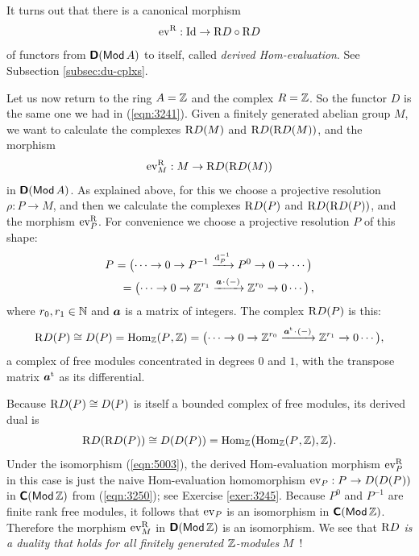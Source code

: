 It turns out that there is a canonical morphism 
\begin{equation} \label{eqn:3247}
\operatorname{ev}^{\mathrm{R}} : \operatorname{Id} \to \mathrm{R} D \circ \mathrm{R} D
\end{equation}
of functors from $\boldsymbol{\mathsf{D}}(\operatorname{\mathsf{Mod}} A)$ to itself, called {\em derived 
Hom-evaluation}. See Subsection 
\ref{subsec:du-cplxs}. 

Let us now return to the ring $A = \mathbb{Z}$ and the complex $R = \mathbb{Z}$. 
So the functor $D$ is the same one we had in (\ref{eqn:3241}).
Given a finitely generated abelian group $M$, we want to calculate the 
complexes $\mathrm{R} D(M)$ and $\mathrm{R} D(\mathrm{R} D(M))$, and the morphism 
\begin{equation} \label{eqn:3248}
\operatorname{ev}^{\mathrm{R}}_M : M \to \mathrm{R} D(\mathrm{R} D(M)) 
\end{equation}
in $\boldsymbol{\mathsf{D}}(\operatorname{\mathsf{Mod}} A)$. As explained above, for this we choose a 
projective resolution $\rho : P \to M$,
and then we calculate  the complexes $\mathrm{R} D(P)$ and 
$\mathrm{R} D(\mathrm{R} D(P))$, and the morphism $\operatorname{ev}^{\mathrm{R}}_P$. 
For convenience we choose a projective resolution $P$ of this shape:
\[ \begin{aligned}
& P^{} = 
\bigl(  \cdots \to 0 \to P^{-1} \xar{\d_P^{-1}} P^0 \to 0 \to \cdots \bigr)
\\ & \quad \ 
= \bigl( \cdots \to 0 \xar{}  \Z^{r_1} \xar{\bsym{a} \cd (-)} \Z^{r_0} \xar{} 0 
\cdots 
\bigr) \, , 
\end{aligned} \]
where $r_0, r_1 \in \mathbb{N}$ and $\boldsymbol{a}$ is a matrix of integers. 
The complex $\mathrm{R} D(P)$ is this: 
\[ \mathrm{R} D(P) \cong D(P) = \operatorname{Hom}_{\mathbb{Z}}(P^{}, \mathbb{Z}) =
\bigl( \cdots \to 0 \xrightarrow{}  \mathbb{Z}^{r_0} \xrightarrow{\boldsymbol{a}^{\mathrm{t}} \mspace{1.5mu}{\cdot}\mspace{1.5mu} (-)}  
\mathbb{Z}^{r_1} \xrightarrow{} 0 \cdots \bigr) , \]
a complex of free modules concentrated in degrees $0$ and $1$, with the 
transpose matrix $\boldsymbol{a}^{\mathrm{t}}$ as its differential. 

Because $\mathrm{R} D(P^{}) \cong D(P^{})$ is itself a bounded complex of 
free modules, its derived dual is 
\begin{equation} \label{eqn:5003}
\mathrm{R} D(\mathrm{R} D(P^{})) \cong D(D(P^{})) = 
\operatorname{Hom}_{\mathbb{Z}} \bigl( \operatorname{Hom}_{\mathbb{Z}}(P^{}, \mathbb{Z}), \mathbb{Z} \bigr) .
\end{equation}
Under the isomorphism (\ref{eqn:5003}), the derived Hom-evaluation morphism 
$\operatorname{ev}^{\mathrm{R}}_P$ in this case is 
just the naive Hom-evaluation homomorphism 
$\operatorname{ev}_P : P^{} \to D(D(P^{}))$ 
in $\boldsymbol{\mathsf{C}}(\operatorname{\mathsf{Mod}} \mathbb{Z})$ from (\ref{eqn:3250}); see Exercise 
\ref{exer:3245}. Because $P^0$ and $P^{-1}$ are finite rank free modules, it 
follows that $\operatorname{ev}_P$ is an isomorphism in $\boldsymbol{\mathsf{C}}(\operatorname{\mathsf{Mod}} \mathbb{Z})$. 
Therefore the morphism $\operatorname{ev}^{\mathrm{R}}_M$ in $\boldsymbol{\mathsf{D}}(\operatorname{\mathsf{Mod}} \mathbb{Z})$
is an isomorphism. We see that  {\em $\mathrm{R} D$ is a duality that holds for 
all finitely generated $\mathbb{Z}$-modules} $M$~!


